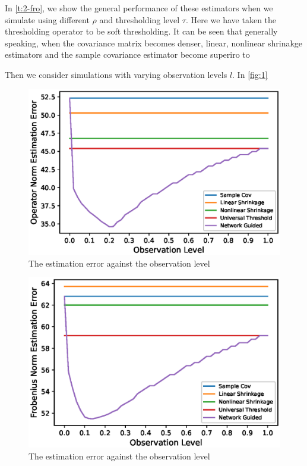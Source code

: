



In \autoref{t:2-fro}, we show the general performance of these estimators when we simulate using different \(\rho\) and thresholding level \(\tau\). Here we have taken the thresholding operator to be soft thresholding. It can be seen that generally speaking, when the covariance matrix becomes denser, linear, nonlinear shrinakge estimators and the sample covariance estimator become superiro to 

Then we consider simulations with varying observation levels \(l\). In \autoref{fig:1}
\begin{figure}[htbp]
     \centering
     \includegraphics{asset/observation-level--2.eps}
     \caption{The estimation error against the observation level}
     \label{fig:1}
\end{figure}
\begin{figure}[htbp]
     \centering
     \includegraphics{asset/observation-level--fro.eps}
     \caption{The estimation error against the observation level}
     \label{fig:2}
\end{figure}
